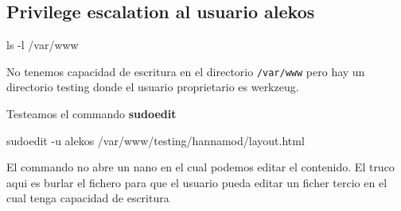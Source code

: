 \documentclass{assets/ipesethesis}
\newenvironment{Shaded}{\begin{snugshade}}{\end{snugshade}}
\newcommand{\BuiltInTok}[1]{#1}
\newcommand{\ExtensionTok}[1]{#1}
\newcommand{\FunctionTok}[1]{\textcolor[rgb]{0.00,0.00,0.00}{#1}}
\newcommand{\NormalTok}[1]{#1}
\newcommand{\OperatorTok}[1]{\textcolor[rgb]{0.81,0.36,0.00}{\textbf{#1}}}
\newcommand{\StringTok}[1]{\textcolor[rgb]{0.31,0.60,0.02}{#1}}
\begin{document}
\hypertarget{privilege-escalation-al-usuario-alekos}{%
\subsection*{Privilege escalation al usuario alekos}\label{privilege-escalation-al-usuario-alekos}}

\begin{Shaded}
\begin{Highlighting}[]
\FunctionTok{ls}\NormalTok{ -l /var/www}
\end{Highlighting}
\end{Shaded}

No tenemos capacidad de escritura en el directorio \texttt{/var/www} pero hay un directorio testing donde el usuario proprietario es werkzeug.

\begin{Shaded}
\end{Shaded}

Testeamos el commando \textbf{sudoedit}

\begin{Shaded}
\begin{Highlighting}[]
\ExtensionTok{sudoedit}\NormalTok{ -u alekos /var/www/testing/hannamod/layout.html}
\end{Highlighting}
\end{Shaded}

El commando no abre un nano en el cual podemos editar el contenido. El truco aqui es burlar el fichero para que el usuario pueda editar
un ficher tercio en el cual tenga capacidad de escritura
\end{document}
